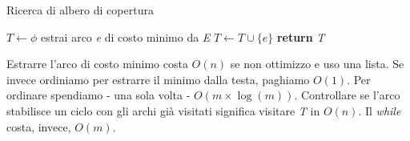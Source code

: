 \begin{algorithm}
	\caption{Ricerca di albero di copertura}\label{alg:AC}
	\begin{algorithmic}[1]
		\State $T \gets \phi$  
		\State estrai arco \textit{e} di costo minimo da \textit{E}
			\State $T \gets T \cup \{e\}$
		\EndIf
		\EndWhile
		\State \textbf{return} \textit{T}
		\EndFunction
	\end{algorithmic}
\end{algorithm}

Estrarre l'arco di costo minimo costa $O(n)$ se non ottimizzo e uso una lista. Se invece ordiniamo per estrarre il minimo dalla testa, paghiamo $O(1)$. Per ordinare spendiamo - una sola volta - $O(m\times \log(m))$. Controllare se l'arco stabilisce un ciclo con gli archi già visitati significa visitare \textit{T} in $O(n)$. Il \textit{while} costa, invece, $O(m)$.